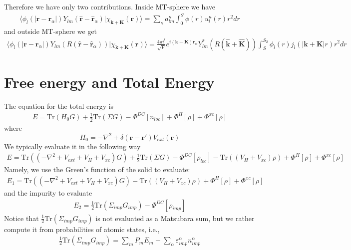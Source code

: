 \documentclass[aps,prb,floatfix,epsfig,twocolumn,showpacs,preprintnumbers]{revtex4}
\renewcommand{\vr}{{\mathbf{r}}}
\newcommand{\vk}{{\mathbf{k}}}
\newcommand{\vK}{{\mathbf{K}}}
\newcommand{\Tr}{\mathrm{Tr}}
\begin{document}
\begin{widetext}
Therefore we have  only two contributions. Inside MT-sphere we have
\begin{eqnarray}
\langle \phi_l(|\vr-\vr_\alpha|) Y_{lm}(\hat{\vr}-\hat{\vr}_\alpha)|\chi_{\vk+\vK}(\vr)\rangle  =
\sum_\kappa a^\kappa_{lm} \int_0^S \phi(r)  u_l^\kappa(r) r^2 dr
\end{eqnarray}
and outside MT-sphere we get
\begin{eqnarray}
\langle \phi_l(|\vr-\vr_\alpha|) Y_{lm}(R(\hat{\vr}-\hat{\vr}_\alpha))|\chi_{\vk+\vK}(\vr)\rangle  =
\frac{4\pi  i^l}{\sqrt{V}}  e^{i(\vk+\vK)\vr_\alpha}Y_{lm}^*(R(\hat{\vk}+\hat{\vK}))
\int_S^{S_2} \phi_l(r) j_l(|\vk+\vK|r)r^2 dr
\end{eqnarray}


\section{Free energy and Total Energy}


The equation for the total energy is
\begin{eqnarray}
E = \Tr(H_0 G) + \frac{1}{2}\Tr(\Sigma G) - \Phi^{DC}[n_{loc}] + \Phi^H[\rho]+\Phi^{xc}[\rho]
\end{eqnarray}
where
$$H_0 = -\nabla^2 + \delta(\vr-\vr')V_{ext}(\vr)$$
We typically evaluate it in the following way
\begin{eqnarray}
E = \Tr((-\nabla^2+V_{ext}+V_{H}+V_{xc}) G) + \frac{1}{2}\Tr(\Sigma G)-\Phi^{DC}[\rho_{loc}] 
-\Tr((V_H+V_{xc})\rho) + \Phi^H[\rho]+\Phi^{xc}[\rho]
\end{eqnarray}
Namely, we use the Green's function of the solid to evaluate:
\begin{eqnarray}
E_1 = \Tr((-\nabla^2+V_{ext}+V_{H}+V_{xc}) G) -\Tr((V_H+V_{xc})\rho) + \Phi^H[\rho]+\Phi^{xc}[\rho]
\end{eqnarray}
and the impurity to evaluate
\begin{eqnarray}
E_2 =  \frac{1}{2}\Tr(\Sigma_{imp} G_{imp})-\Phi^{DC}[\rho_{imp}] 
\end{eqnarray}
Notice that $\frac{1}{2}\Tr(\Sigma_{imp} G_{imp})$ is not evaluated as
a Matsubara sum, but we rather compute it from probabilities of atomic
states, i.e.,
\begin{eqnarray}
 \frac{1}{2}\Tr(\Sigma_{imp} G_{imp}) = \sum_m P_m E_m - \sum_\alpha
 \varepsilon_{imp}^\alpha n_{imp}^\alpha
\end{eqnarray}




\end{widetext}
\end{document}

